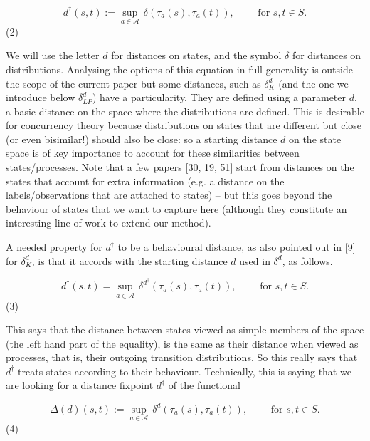 \documentclass[10pt,a4paper]{article}
\begin{document}
\par  \quad  \[d^{\dagger}(s,t):=\sup_{a\in\mathcal{A}}\,\delta(\tau_{a}(s),\tau_{a}(t)),\qquad\mbox{ for $s,t\in S$.}\]\quad  \quad  (2)\quad  
  
We will use the letter $d$ for distances on states, and the symbol $\delta$ for distances on distributions. Analysing the options of this equation in full generality is outside the scope of the current paper but some distances, such as $\delta_{K}^{d}$ (and the one we introduce below $\delta^{d}_{LP}$) have a particularity. They are defined using a parameter $d$, a basic distance on the space where the distributions are defined. This is desirable for concurrency theory because distributions on states that are different but close (or even bisimilar!) should also be close: so a starting distance $d$ on the state space is of key importance to account for these similarities between states/processes. Note that a few papers [30, 19, 51] start from distances on the states that account for extra information (e.g. a distance on the labels/observations that are attached to states) – but this goes beyond the behaviour of states that we want to capture here (although they constitute an interesting line of work to extend our method).\par
 
 
 
A needed property for $d^{\dagger}$ to be a behavioural distance, as also pointed out in [9] for $\delta_{K}^{d}$, is that it accords with the starting distance $d$ used in $\delta^{d}$, as follows.\par
  
\par  \quad  \[d^{\dagger}(s,t)=\sup_{a\in\mathcal{A}}\,\delta^{d^{\dagger}}(\tau_{a}(s),\tau_{a}(t)),\qquad\mbox{ for $s,t\in S$.}\]\quad  \quad  (3)\quad  
  
This says that the distance between states viewed as simple members of the space (the left hand part of the equality), is the same as their distance when viewed as processes, that is, their outgoing transition distributions. So this really says that $d^{\dagger}$ treats states according to their behaviour. Technically, this is saying that we are looking for a distance fixpoint $d^{\dagger}$ of the functional\par
  
\par  \quad  \[\Delta(d)(s,t):=\sup_{a\in\mathcal{A}}\,\delta^{d}(\tau_{a}(s),\tau_{a}(t)),\qquad\mbox{ for $s,t\in S$.}\]\quad  \quad  (4)\quad  
  
\end{document}
